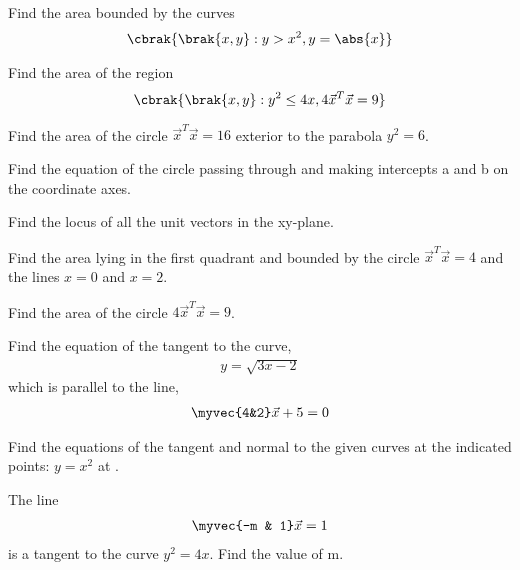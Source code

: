 %
\item Find the area bounded by the curves
\begin{align}
\cbrak{\brak{x,y} : y > x^2, y = \abs{x}}
\end{align}
%
\item Find the area of the region
\begin{align}
\cbrak{\brak{x,y} : y^2 \le 4x, 4\vec{x}^T\vec{x} = 9}
\end{align}
%
\item Find the area of the circle $\vec{x}^T\vec{x} = 16$ exterior to the parabola $y^2 = 6$.
\item Find the equation of the circle passing through  and making intercepts a and b on the coordinate axes.
\item Find the locus of all the unit vectors in the xy-plane.
\item Find the area lying in the first quadrant and bounded by the circle $\vec{x}^T\vec{x}=4$ and the lines $x = 0$ and $x = 2$.
%
\item Find the area of the circle $4\vec{x}^T\vec{x}=9$.
\item  Find the equation of the tangent to the curve,
\begin{align}
y = \sqrt{3x-2}
\label{eq:solutions/conics/1/19/Q}
\end{align}
 which is parallel to the line,
\begin{align}
\myvec{4&2}\vec{x}+5=0
\label{eq:solutions/conics/1/19/P}
\end{align}  
\item Find the equations of the tangent and normal to the given curves at the indicated points:
$
y = x^2
$
at .
\item The line 
\begin{align}
\myvec{-m & 1}\vec{x} = 1 \label{eq:solutions/conics/3/2/21/eq: 1}
\end{align}
is a tangent to the curve $y^2 = 4x$. Find the value of m.
